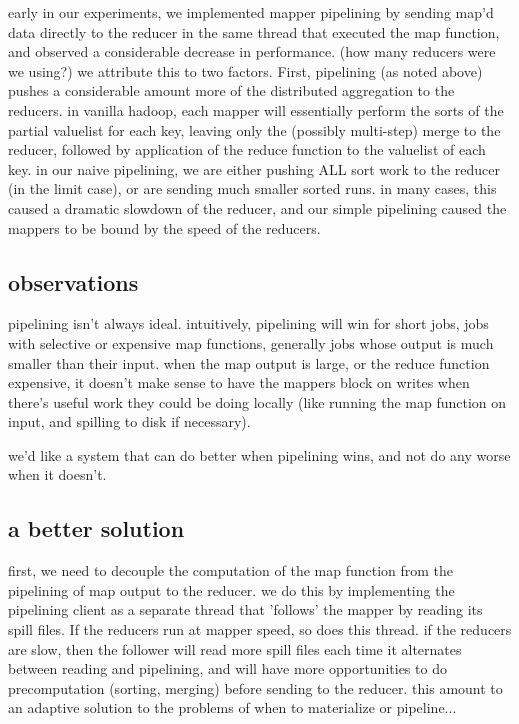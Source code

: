 early in our experiments, we implemented mapper pipelining by sending map'd data directly to the reducer in the same thread that executed the map function, and observed a considerable decrease in performance. (how many reducers were we using?)  we attribute this to two factors.  First, pipelining (as noted above) pushes a considerable amount more of the distributed aggregation to the reducers.  in vanilla hadoop, each mapper will essentially perform the sorts of the partial valuelist for each key, leaving only the (possibly multi-step) merge to the reducer, followed by application of the reduce function to the valuelist of each key.  in our naive pipelining, we are either pushing ALL sort work to the reducer (in the limit case), or are sending much smaller sorted runs. in many cases, this caused a dramatic slowdown of the reducer, and our simple pipelining caused the mappers to be bound by the speed of the reducers.

\subsection{observations}

pipelining isn't always ideal.  intuitively, pipelining will win for
short jobs, jobs with selective or expensive map functions, generally
jobs whose output is much smaller than their input.  when the map
output is large, or the reduce function expensive, it doesn't make
sense to have the mappers block on writes when there's useful work
they could be doing locally (like running the map function on input,
and spilling to disk if necessary). 

we'd like a system that can do better when pipelining wins, and not do any worse when it doesn't.

\subsection{a better solution}

first, we need to decouple the computation of the map function from the pipelining of map output to the reducer.  we do this by implementing the pipelining client as a separate thread that 'follows' the mapper by reading its spill files.  If the reducers run at mapper speed, so does this thread.  if the reducers are slow, then the follower will read more spill files each time it alternates between reading and pipelining, and will have more opportunities to do precomputation (sorting, merging) before sending to the reducer.  this amount to an adaptive solution to the problems of when to materialize or pipeline...

